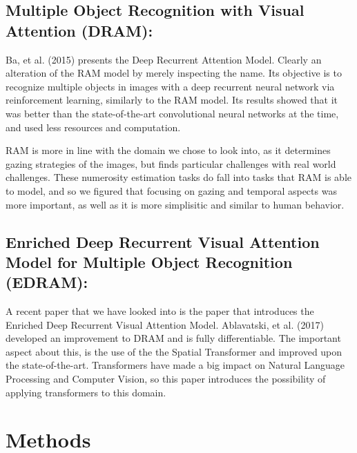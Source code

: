 \documentclass{article}
\begin{document}
\subsection{Multiple Object Recognition with Visual Attention (DRAM): }
Ba, et al. (2015) \cite{DRAM} presents the Deep Recurrent Attention Model. Clearly an alteration of the RAM model by merely inspecting the name. Its objective is to recognize multiple objects in images with a deep recurrent neural network via reinforcement learning, similarly to the RAM model. Its results showed that it was better than the state-of-the-art convolutional neural networks at the time, and used less resources and computation.

RAM is more in line with the domain we chose to look into, as it determines gazing strategies of the images, but finds particular challenges with real world challenges. These numerosity estimation tasks do fall into tasks that RAM is able to model, and so we figured that focusing on gazing and temporal aspects was more important, as well as it is more simplisitic and similar to human behavior.

\subsection{Enriched Deep Recurrent Visual Attention Model for Multiple Object
Recognition (EDRAM): }

A recent paper that we have looked into is the paper that introduces the Enriched Deep Recurrent Visual Attention Model. Ablavatski, et al. (2017) \cite{EDRAM} developed an improvement to DRAM and is fully differentiable. The important aspect about this, is the use of the the Spatial Transformer and improved upon the state-of-the-art. Transformers have made a big impact on Natural Language Processing and Computer Vision, so this paper introduces the possibility of applying transformers to this domain.




\section{Methods}
\end{document}
